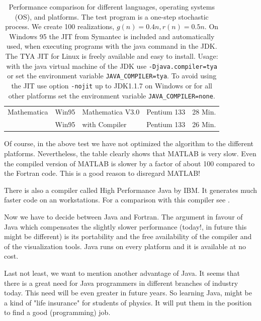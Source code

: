 \begin{table}[htbp]
\begin{center}
\begin{tabular}{llp{3cm}|c|c}
Mathematica& Win95 & Mathematica V3.0 & Pentium 133 & 28 Min. \\
           & Win95 & with Compiler    & Pentium 133 & 26 Min. \\ \hline
    \end{tabular}
    \caption[Performance Table.]%
    {Performance comparison for different languages, operating
      systems (OS), and platforms.
      The test program is a one-step stochastic process. We create 100
      realizations, $g(n)=0.4n, r(n)=0.5n$. On Windows 95 the JIT from
      Symantec is included and automatically used, when executing programs
      with the java command in the JDK. The TYA JIT for Linux is freely
      available and easy to install. Usage: with the java virtual machine of
      the JDK use \texttt{-Djava.compiler=tya} or 
      set the environment variable \texttt{JAVA\_COMPILER=tya}. To avoid
      using the JIT use option \texttt{-nojit} up to JDK1.1.7 on Windows or
      for all other platforms set the environment variable 
      \texttt{JAVA\_COMPILER=none}.
      }
    \label{tab:performance}
  \end{center}
\end{table}


Of course, in the above test we have not optimized the algorithm to the 
different platforms. Nevertheless, the table clearly shows that MATLAB is 
very slow. Even the compiled version of MATLAB is slower by a factor of 
about 100 
compared to the Fortran code. This is a good reason to disregard MATLAB!

There is also a compiler called High Performance Java by IBM. It generates
much faster code on an workstations. For a comparison with this
compiler see \cite{HPJ}.

Now we have to decide between Java and Fortran. The argument in favour of 
Java which compensates the slightly slower performance (today!, in future 
this might be different) is its portability and the free availability of the
compiler and of the visualization tools. Java runs on every platform and 
it is available at no cost. 

Last not least, we want to mention another advantage of Java. It seems
\cite[]{bigbucks} that there is  a great need for Java programmers in 
different branches of industry today. This need will be even greater in future 
years. So learning Java, might be a kind of "life insurance" for students of 
physics. It will put them in the position to find a good (programming) job.


